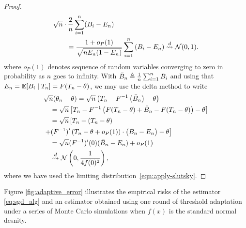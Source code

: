 \begin{proof}
  \begin{align}
    &\sqrt{n}
    \cdot \frac{2}{n} \sum_{i = 1}^n (B_i - E_n)
    \\
    & \qquad  =
 \frac{1 + o_P(1)}{\sqrt{n E_n(1 - E_n)}}
    \sum_{i = 1}^n \left(B_i - E_n\right)
    \stackrel{d}{\rightsquigarrow} \mathcal{N}(0, 1).
    \label{eqn:apply-slutsky}
  \end{align}
  where $o_P(1)$ denotes sequence of random variables converging to zero in probability as $n$ goes to infinity. With $\bar{B}_n \triangleq \frac{1}{n} \sum_{i = 1}^n B_i$ and using that $E_n = \mathbb{E}[B_i \mid T_n] = F(T_n - \theta)$, we may use the delta method to write
  \begin{align*}
    & \sqrt{n}(\theta_n - \theta)
     = \sqrt{n}\left(T_n - F^{-1}\left( \bar{B}_n \right)
    - \theta \right) \\
    &\quad  = \sqrt{n} \left[T_n - F^{-1}\left(F(T_n - \theta)
    + \bar{B}_n - F(T_n - \theta)\right) - \theta \right] \\
    & \quad = \sqrt{n} \left[ T_n - (T_n - \theta ) \right. \\
    &  \left. +  (F^{-1})' \left(T_n - \theta + o_P(1) \right)  
    \cdot \left(\bar{B}_n - E_n\right) - \theta \right] \\
    & \quad = \sqrt{n} (F^{-1})'(0) ( \bar{B}_n - E_n)
    + o_P(1) \\
    & \quad \stackrel{d}{\rightsquigarrow} \mathcal{N}\left(0, \frac{1}{4 f(0)^2}\right),
  \end{align*}
  where we have used the limiting distribution~\eqref{eqn:apply-slutsky}. 
\end{proof}
%

Figure \ref{fig:adaptive_error} illustrates the empirical risks 
of the estimator \eqref{eq:sgd_alg} and an estimator obtained using one round of threshold adaptation under a series of Monte Carlo simulations when $f(x)$ is the standard normal desnity.


